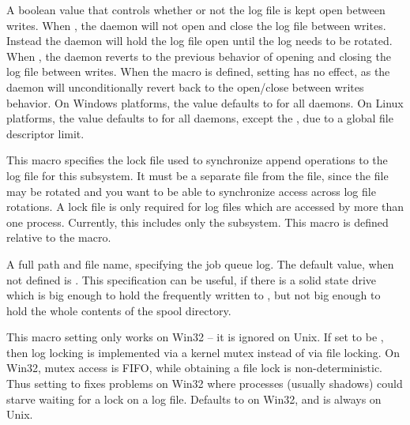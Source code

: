 \begin{description}
\label{param:SubsysLogKeepOpen}
\item[\MacroB{<SUBSYS>\_LOG\_KEEP\_OPEN}]
  A boolean value that controls whether or not the log file is kept open 
  between writes.
  When , the daemon will not open and close the log file
  between writes.  Instead the daemon will hold the log file open until the log
  needs to be rotated. 
  When , the daemon reverts to the previous behavior
  of opening and closing the log file between writes.  
  When the  macro is defined,
  setting  has no effect,
  as the daemon
  will unconditionally revert back to the open/close between writes behavior.
  On Windows platforms,
  the value defaults to  for all daemons. 
  On Linux platforms,
  the value defaults to  for all daemons,
  except the ,
  due to a global file descriptor limit.

\label{param:SubsysLock} 
\item[\MacroB{<SUBSYS>\_LOCK}]
  This macro
  specifies the lock file used to synchronize append operations to the
  log file for this subsystem.  It must be a separate file from the
   file, since the  file may be
  rotated and you want to be able to synchronize access across log
  file rotations.  A lock file is only required for log files which
  are accessed by more than one process.  Currently, this includes
  only the  subsystem.  This macro is defined relative
  to the  macro.

\label{param:JobQueueLog} 
\item[\Macro{JOB\_QUEUE\_LOG}]
  A full path and file name, specifying the job queue log.  
  The default value, when not defined is .
  This specification can be useful,
  if there is a solid state drive which is big enough to hold the
  frequently written to ,
  but not big enough to hold the whole contents of the spool directory.

\label{param:FileLockViaMutex} 
\item[\Macro{FILE\_LOCK\_VIA\_MUTEX}]
  This macro setting only works on Win32 -- it is ignored on Unix.  If set
  to be , then log locking is implemented via a kernel mutex
  instead of via file locking.  On Win32, mutex access is FIFO, while
  obtaining a file lock is non-deterministic.  Thus setting to 
  fixes problems on Win32 where processes (usually shadows) could starve
  waiting for a lock on a log file.  Defaults to  on Win32, and is
  always  on Unix.


\end{description}
